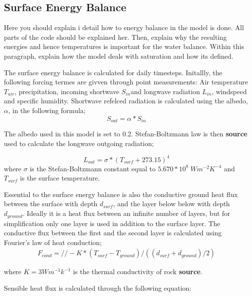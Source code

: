 \documentclass[a4paper,11pt,twocolumn]{article}
\begin{document}
\subsection{Surface Energy Balance}
Here you should explain i detail how to energy balance in the model is done. All parts of the code should be explained her. Then, explain why the resulting energies and hence temperatures is important for the water balance. Within this paragraph, explain how the model deals with saturation and how its defined. 

The surface energy balance is calculated for daily timesteps. Initallly, the following forcing termes are givven through point  measurements: Air temperature $T_{air}$, precipitation, incoming shortwave $S_{in} $and longwave radiation $L_{in}$, windspeed and specific humidity.
Shortwave refelced radiation is calculated using the albedo, $\alpha$, in the following formula;
\begin{equation}
	S_{out} = \alpha * S_{in}
\end{equation}

The albedo used in this model is set to 0.2. Stefan-Boltzmann law is then \textbf{source} used to calculate the longwave outgoing radiation;

\begin{equation}
	L_{out} = \sigma * (T_{surf}+273.15)^4
\end{equation}
where $\sigma$ is the Stefan-Boltzmann constant equal to $5.670*10^8 \; Wm^{-2}K^{-4}$ and $T_{surf}$ is the surface temperature. 

Essential to the surface energy balance is also the conductive ground heat flux between the surface with depth $d_{surf}$, and the layer below below with depth $d_{ground}$. Ideally it is a heat flux between an infinite number of layers, but for simplification only one layer is used in addition to the surface layer. The conductive flux between the first and the second layer is calculated using Fourier's law of heat conduction;
\begin{equation}
\begin{multlined}
F_{cond} = //
-K*(T_{surf}-T_{ground})/((d_{surf}+d_{ground})/2)
\end{multlined}
\end{equation}
	
where $K = 3 Wm^{-1}k^{-1}$ is the thermal conductivity of rock \textbf{source}. 

Sensible heat flux is calculated through the following equation: 
\end{document}
